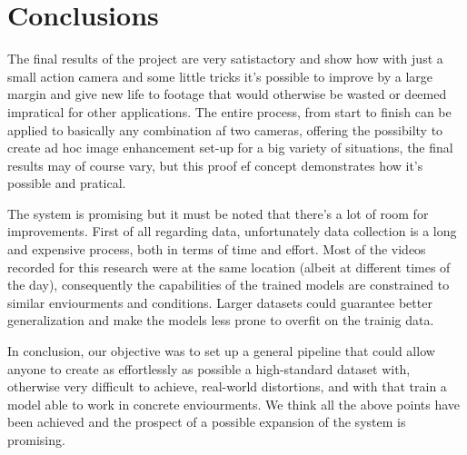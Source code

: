 \newpage
\chapter{Conclusions}
\label{cha:conclusions}

The final results of the project are very satistactory and show how with just a small action camera and some little tricks it's possible to improve by a large margin and give new life to footage that would otherwise be wasted or deemed impratical for other applications. The entire process, from start to finish can be applied to basically any combination af two cameras, offering the possibilty to create ad hoc image enhancement set-up for a big variety of situations, the final results may of course vary, but this proof ef concept demonstrates how it's possible and pratical.

The system is promising but it must be noted that there's a lot of room for improvements. First of all regarding data, unfortunately data collection is a long and expensive process, both in terms of time and effort. Most of the videos recorded for this research were at the same location (albeit at different times of the day), consequently the capabilities of the trained models are constrained to similar enviourments and conditions. Larger datasets could guarantee better generalization and make the models less prone to overfit on the trainig data.

In conclusion, our objective was to set up a general pipeline that could allow anyone to create as effortlessly as possible a high-standard dataset with, otherwise very difficult to achieve, real-world distortions, and with that train a model able to work in concrete enviourments. We think all the above points have been achieved and the prospect of a possible expansion of the system is promising.
